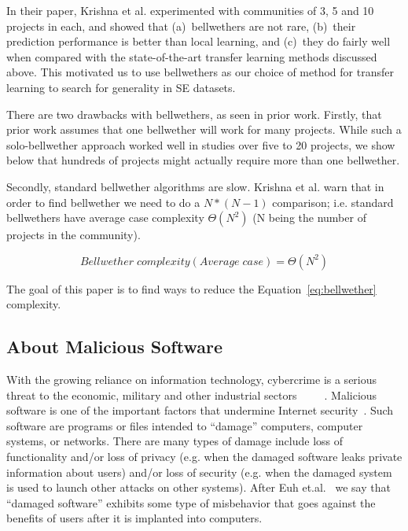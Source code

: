 \ei

In their paper, Krishna et al. experimented with communities of 3, 5 and 10 projects in each, and showed that (a)~bellwethers are not rare, (b)~their prediction performance is better than local learning, and (c)~they do fairly well when compared with 
the state-of-the-art transfer learning methods discussed above.
This motivated us to use  bellwethers as our choice of method for transfer learning to search for generality in SE datasets. 

There are two drawbacks with bellwethers, as seen in prior work.
Firstly, that prior work assumes that one bellwether will work for many projects. While such a solo-bellwether approach worked well
in studies over five to 20 projects, we show below that hundreds of projects might actually require more than one bellwether.

Secondly, standard bellwether algorithms are   slow.
 Krishna et al. warn that in order to find bellwether we need to do a $ N*(N-1) $ comparison; i.e. standard bellwethers
have average case complexity $ \Theta(N^2) $ (N being the number of projects in the community). 

\begin{equation}
\label{eq:bellwether}
    \mathit{Bellwether\; complexity (Average\;  case) } = \Theta(N^2)
\end{equation}

The goal of this paper is to find ways to reduce the Equation~\ref{eq:bellwether} complexity.





\subsection{About Malicious Software}
With the growing reliance on information technology, cybercrime is a serious threat to the economic, military and other industrial sectors~\cite{bissell2019cost}~\cite{jang2014survey}~\cite{chang2019evaluating}~\cite{opderbeck2015cybersecurity}~\cite{rovskot2020cybercrime}. 
Malicious software is one of the important factors that undermine Internet security~\cite{dai19}. 
Such software are programs or files intended to ``damage'' computers, computer systems, or networks. There are many types of damage include loss of functionality and/or loss of privacy
(e.g. when the damaged software leaks private information about users) and/or loss of security (e.g. when the damaged system is used to launch other attacks on other systems). After Euh et.al.~\cite{euh2020comparative} we say that ``damaged software'' exhibits some type of misbehavior that goes against the benefits of users after it is implanted into computers. 
 

